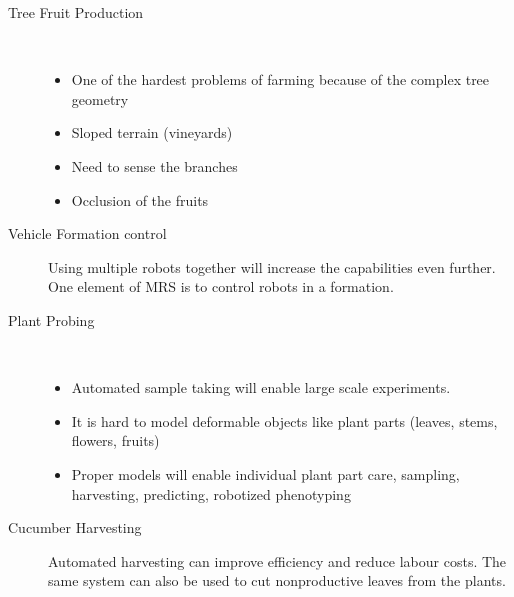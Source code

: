 \documentclass{article}
\begin{document}
\begin{description}
    \item[Tree Fruit Production] \
    \begin{itemize}
        \item One of the hardest problems of farming because of the complex tree geometry
        \item Sloped terrain (vineyards)
        \item Need to sense the branches
        \item Occlusion of the fruits
    \end{itemize}
    \item[Vehicle Formation control] Using multiple robots together will increase the capabilities even further. One element of MRS is to control robots in a formation.
    \item[Plant Probing] \
    \begin{itemize}
        \item Automated sample taking will enable large scale experiments.
        \item It is hard to model deformable objects like plant parts (leaves, stems, flowers, fruits)
        \item Proper models will enable individual plant part care, sampling, harvesting, predicting, robotized phenotyping
    \end{itemize} 
    \item[Cucumber Harvesting] Automated harvesting can improve efficiency and reduce labour costs. The same system can also be used to cut nonproductive leaves from the plants.

\end{description} 
\end{document}
